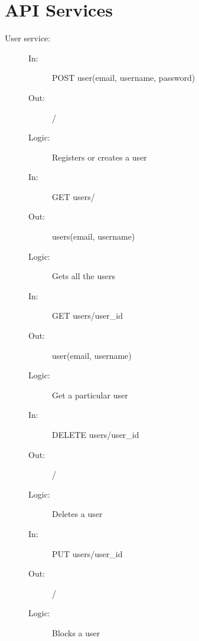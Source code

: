 \documentclass{article}
\begin{document}
\section{API Services}
\begin{description}
    \item [User service:] 
    \begin{description}
        \item[]
        \item[In:] POST user(email, username, password)
        \item[Out:] /
        \item[Logic:] Registers or creates a user
        \item[]
    \end{description}
    \begin{description}
        \item[]
        \item[In:] GET users/
        \item[Out:] users(email, username)
        \item[Logic:] Gets all the users
        \item[]
    \end{description}
    \begin{description}
        \item[]
        \item[In:] GET users/user\_id
        \item[Out:] user(email, username)
        \item[Logic:] Get a particular user
        \item[]
    \end{description}
    \begin{description}
        \item[]
        \item[In:] DELETE users/user\_id
        \item[Out:] /
        \item[Logic:] Deletes a user
        \item[]
    \end{description}
    \begin{description}
        \item[]
        \item[In:] PUT users/user\_id
        \item[Out:] /
        \item[Logic:] Blocks a user
        \item[]
    \end{description}
\end{description}
\end{document}
